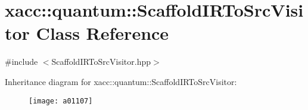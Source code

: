 \hypertarget{a01107}{}\section{xacc\+:\+:quantum\+:\+:Scaffold\+I\+R\+To\+Src\+Visitor Class Reference}
\label{a01107}


{\ttfamily \#include $<$Scaffold\+I\+R\+To\+Src\+Visitor.\+hpp$>$}

Inheritance diagram for xacc\+:\+:quantum\+:\+:Scaffold\+I\+R\+To\+Src\+Visitor\+:\begin{figure}[H]
\begin{center}
\leavevmode
\texttt{[image: a01107]}
\end{center}
\end{figure}

